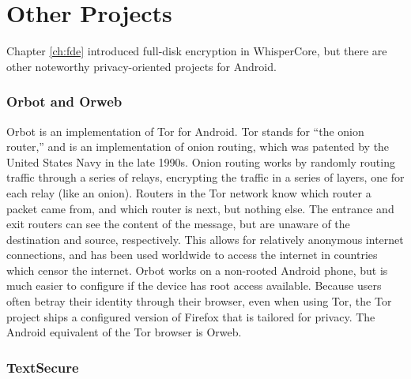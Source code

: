 \section{Other Projects}

Chapter \ref{ch:fde} introduced full-disk encryption in WhisperCore, but there are other noteworthy privacy-oriented projects for Android. 

\subsubsection{Orbot and Orweb}

Orbot is an implementation of Tor for Android. Tor stands for ``the onion router,'' and is an implementation of onion routing,
which was patented by the United States Navy in the late 1990s.  Onion routing works by randomly routing traffic through a series of
relays, encrypting the traffic in a series of layers, one for each relay (like an onion). Routers in the Tor network know which
router a packet came from, and which router is next, but nothing else. The entrance and exit routers can see the content of the
message, but are unaware of the destination and source, respectively. This allows for relatively anonymous internet connections, and
has been used worldwide to access the internet in countries which censor the internet. Orbot works on a non-rooted Android phone,
but is much easier to configure if the device has root access available. Because users often betray their identity through their
browser, even when using Tor, the Tor project ships a configured version of Firefox that is tailored for privacy. The Android
equivalent of the Tor browser is Orweb.


\subsubsection{TextSecure}

